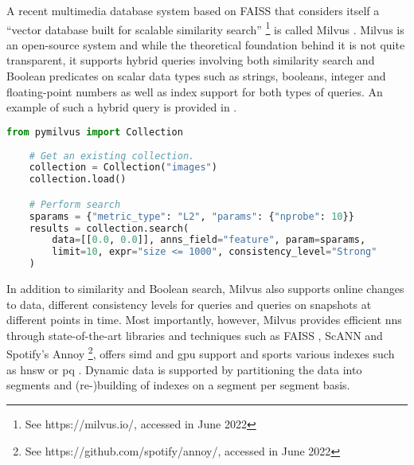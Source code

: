 A recent multimedia database system based on FAISS that considers itself a ``vector database built for scalable similarity search'' \footnote{See https://milvus.io/, accessed in June 2022} is called Milvus \cite{Wang:2021Milvus}. Milvus is an open-source system and while the theoretical foundation behind it is not quite transparent, it supports hybrid queries involving both similarity search and Boolean predicates on scalar data types such as strings, booleans, integer and floating-point numbers as well as index support for both types of queries. An example of such a hybrid query is provided in . 

\begin{lstlisting}[language=Python, caption={Example of a hybrid query to Milvus in Python. The \texttt{expr} parameter can be used to specify Boolean filters. Source: https://milvus.io/}, label={listing:milvus_query}]
    from pymilvus import Collection
    
    # Get an existing collection.
    collection = Collection("images")      
    collection.load()

    # Perform search
    sparams = {"metric_type": "L2", "params": {"nprobe": 10}}
    results = collection.search(
        data=[[0.0, 0.0]], anns_field="feature", param=sparams, 
        limit=10, expr="size <= 1000", consistency_level="Strong"
    )
\end{lstlisting}

In addition to similarity and Boolean search, Milvus also supports online changes to data, different consistency levels for queries and queries on snapshots at different points in time. Most importantly, however, Milvus provides efficient \acrshort{nns} through state-of-the-art libraries and techniques such as FAISS \cite{Johnson:2019Billion}, ScANN \cite{Guo:2020Accelerating} and Spotify's Annoy \footnote{See https://github.com/spotify/annoy/, accessed in June 2022}, offers \acrshort{simd} and \acrshort{gpu} support and sports various indexes such as \acrshort{hnsw} \cite{Malkov:2018Efficient} or \acrshort{pq} \cite{Jegou:2010Product}. Dynamic data is supported by partitioning the data into segments and (re-)building of indexes on a segment per segment basis.